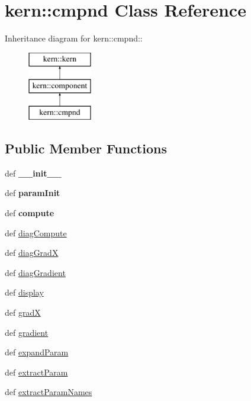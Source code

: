 \hypertarget{classkern_1_1cmpnd}{
\section{kern::cmpnd Class Reference}
\label{classkern_1_1cmpnd}
}
Inheritance diagram for kern::cmpnd::\begin{figure}[H]
\begin{center}
\leavevmode
\includegraphics[height=3cm]{classkern_1_1cmpnd}
\end{center}
\end{figure}
\subsection*{Public Member Functions}
\begin{CompactItemize}
\item 
\hypertarget{classkern_1_1cmpnd_ae3454cc98bd9dee5aca8e026aeb3f39}{
def \textbf{\_\-\_\-init\_\-\_\-}}
\label{classkern_1_1cmpnd_ae3454cc98bd9dee5aca8e026aeb3f39}

\item 
\hypertarget{classkern_1_1cmpnd_75661bd9826c15420989baef60f37983}{
def \textbf{paramInit}}
\label{classkern_1_1cmpnd_75661bd9826c15420989baef60f37983}

\item 
\hypertarget{classkern_1_1cmpnd_2cd292ccfbaee98ed2988bb88673f235}{
def \textbf{compute}}
\label{classkern_1_1cmpnd_2cd292ccfbaee98ed2988bb88673f235}

\item 
def \hyperlink{classkern_1_1cmpnd_5852fb0a16565b8a888c5b32399a0abd}{diagCompute}
\item 
def \hyperlink{classkern_1_1cmpnd_fa9a662412350b04289be9554bfd2b6e}{diagGradX}
\item 
def \hyperlink{classkern_1_1cmpnd_9ae8217ccbe28caeaa509ee33123c67a}{diagGradient}
\item 
def \hyperlink{classkern_1_1cmpnd_5f0881b786c5ffcf0262732c8f119d1a}{display}
\item 
def \hyperlink{classkern_1_1cmpnd_ae07d88bf593fd048c2a0464bfd923b8}{gradX}
\item 
def \hyperlink{classkern_1_1cmpnd_bae88f1fa7e84fa6d7651313460d35fc}{gradient}
\item 
def \hyperlink{classkern_1_1cmpnd_4fa764e9b24f54a8eb3ee05f07983452}{expandParam}
\item 
def \hyperlink{classkern_1_1cmpnd_318f984498fc390d902dd5bc2358cf66}{extractParam}
\item 
def \hyperlink{classkern_1_1cmpnd_265822a277cefcadc62b50c5a4f2cc1a}{extractParamNames}
\end{CompactItemize}
